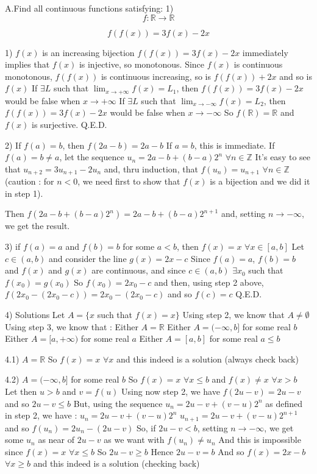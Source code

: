 \begin{solution}
	\begin{tcolorbox}A.Find all continuous  functions satisfying:
1)
\[ f: \mathbb R \to \mathbb R
\]

\[ f(f(x)) = 3f(x) - 2x
\]
\end{tcolorbox}
1) $ f(x)$ is an increasing bijection
$ f(f(x))=3f(x)-2x$ immediately implies that $ f(x)$ is injective, so monotonous.
Since $ f(x)$ is continuous monotonous, $ f(f(x))$ is continuous increasing, so is $ f(f(x))+2x$ and so is $ f(x)$
If $ \exists L$ such that $ \lim_{x\to +\infty}f(x)=L_1$, then $ f(f(x))=3f(x)-2x$ would be false when $ x\to +\infty$
If $ \exists L$ such that $ \lim_{x\to -\infty}f(x)=L_2$, then $ f(f(x))=3f(x)-2x$ would be false when $ x\to -\infty$
So $ f(\mathbb R)=\mathbb R$ and $ f(x)$ is surjective.
Q.E.D.

2) If $ f(a)=b$, then $ f(2a-b)=2a-b$
If $ a=b$, this is immediate.
If $ f(a)=b\neq a$, let the sequence $ u_n=2a-b+(b-a)2^n$ $ \forall n\in \mathbb Z$
It's easy to see that $ u_{n+2}=3u_{n+1}-2u_n$ and, thru induction,  that $ f(u_n)=u_{n+1}$ $ \forall n\in\mathbb Z$ (caution : for $ n<0$, we need first to show that $ f(x)$ is a bijection and we did it in step 1).

Then $ f(2a-b+(b-a)2^n)=2a-b+(b-a)2^{n+1}$ and, setting $ n\to -\infty$, we get the result.

3) if $ f(a)=a$ and $ f(b)=b$ for some $ a<b$, then $ f(x)=x$ $ \forall x\in [a,b]$
Let $ c\in(a,b)$ and consider the line $ g(x)=2x-c$
Since $ f(a)=a$, $ f(b)=b$ and $ f(x)$ and $ g(x)$ are continuous, and since $ c\in(a,b)$ $ \exists x_0$ such that $ f(x_0)=g(x_0)$
So $ f(x_0)=2x_0-c$ and then, using step 2 above, $ f(2x_0-(2x_0-c))=2x_0-(2x_0-c)$ and so $ f(c)=c$
Q.E.D.

4) Solutions
Let $ A=\{x$ such that $ f(x)=x\}$
Using step 2, we know that $ A\neq\emptyset$
Using step 3, we know that :
Either $ A=\mathbb R$
Either $ A=(-\infty,b]$ for some real $ b$
Either $ A=[a,+\infty)$ for some real $ a$
Either $ A=[a,b]$ for some real $ a\leq b$

4.1) $ A=\mathbb R$
So $ f(x)=x$ $ \forall x$ and this indeed is a solution (always check back)

4.2) $ A=(-\infty,b]$ for some real $ b$
So $ f(x)=x$ $ \forall x\leq b$ and $ f(x)\neq x$ $ \forall x>b$
Let then $ u>b$ and $ v=f(u)$
Using now step 2, we have $ f(2u-v)=2u-v$ and so $ 2u-v\leq b$
But, using the sequence $ u_n=2u-v+(v-u)2^n$ as defined in step 2, we have :
$ u_n=2u-v+(v-u)2^n$
$ u_{n+1}=2u-v+(v-u)2^{n+1}$
and so $ f(u_n)=2u_n-(2u-v)$
So, if $ 2u-v<b$, setting $ n\to -\infty$, we get some $ u_n$ as near of $ 2u-v$ as we want with $ f(u_n)\neq u_n$
And this is impossible since $ f(x)=x$ $ \forall x\leq b$
So $ 2u-v\geq b$
Hence $ 2u-v=b$
And so $ f(x)=2x-b$ $ \forall x\geq b$
and this indeed is a solution (checking back)


\end{solution}
